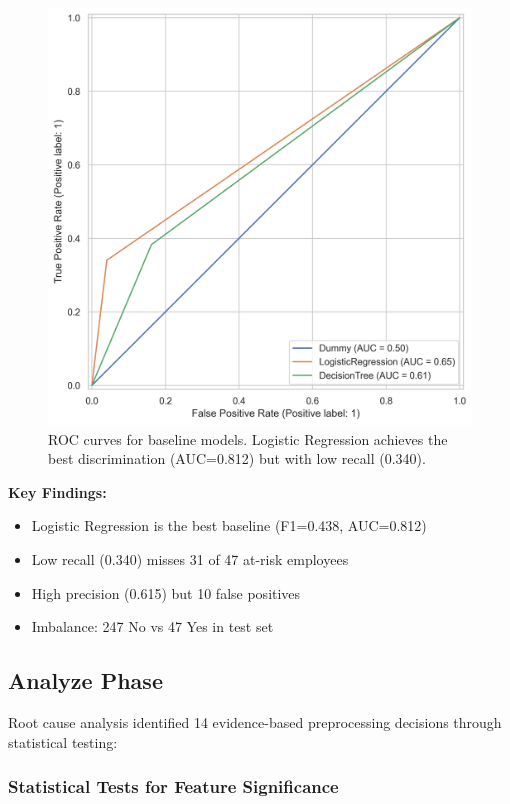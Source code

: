 \documentclass[conference]{IEEEtran}
\begin{document}
\begin{figure}[!t]
  \centering
  \includegraphics[width=\linewidth]{baseline_roc_curves.png}
  \caption{ROC curves for baseline models. Logistic Regression achieves the best discrimination (AUC=0.812) but with low recall (0.340).}
  \label{fig:baseline_roc}
\end{figure}

\textbf{Key Findings:}
\begin{itemize}
    \item Logistic Regression is the best baseline (F1=0.438, AUC=0.812)
    \item Low recall (0.340) misses 31 of 47 at-risk employees
    \item High precision (0.615) but 10 false positives
    \item Imbalance: 247 No vs 47 Yes in test set
\end{itemize}

\subsection{Analyze Phase}

Root cause analysis identified 14 evidence-based preprocessing decisions through statistical testing:

\subsubsection{Statistical Tests for Feature Significance}
\end{document}
